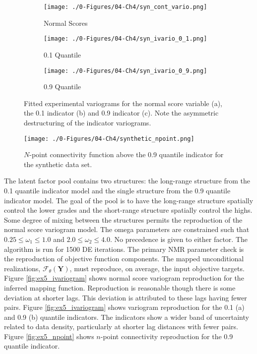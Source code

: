 \begin{figure}
    \begin{subfigure}{1.0\textwidth}
        \centering
        \texttt{[image: ./0-Figures/04-Ch4/syn\_cont\_vario.png]}
        \caption{Normal Scores}
    \end{subfigure}
    \begin{subfigure}{1.0\textwidth}
        \centering
        \texttt{[image: ./0-Figures/04-Ch4/syn\_ivario\_0\_1.png]}
        \caption{0.1 Quantile}
    \end{subfigure}
    \begin{subfigure}{1.0\textwidth}
        \centering
        \texttt{[image: ./0-Figures/04-Ch4/syn\_ivario\_0\_9.png]}
        \caption{0.9 Quantile}
    \end{subfigure}
    \caption{Fitted experimental variograms for the normal score variable (a), the 0.1 indicator (b) and 0.9 indicator (c). Note the asymmetric destructuring of the indicator variograms. }
    \label{fig:synthetic_varios}
\end{figure}

\begin{figure}[htb!]
    \centering
    \texttt{[image: ./0-Figures/04-Ch4/synthetic\_npoint.png]}
    \caption{$N$-point connectivity function above the 0.9 quantile indicator for the synthetic data set.}
    \label{fig:synthetic_npoint}
\end{figure}

The latent factor pool contains two structures: the long-range structure from the 0.1 quantile indicator model and the single structure from the 0.9 quantile indicator model. The goal of the pool is to have the long-range structure spatially control the lower grades and the short-range structure spatially control the highs. Some degree of mixing between the structures permits the reproduction of the normal score variogram model. The omega parameters are constrained such that $0.25 \leq \omega_{1} \leq 1.0$ and $2.0 \leq \omega_{2} \leq 4.0$. No precedence is given to either factor. The algorithm is run for 1500 \gls{DE} iterations. The primary \gls{NMR} parameter check is the reproduction of objective function components. The mapped unconditional realizations, $\mathcal{F}_{\theta}\left(\mathbf{Y}\right)$, must reproduce, on average, the input objective targets. Figure \ref{fig:ex5_ivariogram} shows normal score variogram reproduction for the inferred mapping function. Reproduction is reasonable though there is some deviation at shorter lags. This deviation is attributed to these lags having fewer pairs. Figure \ref{fig:ex5_ivariogram} shows variogram reproduction for the 0.1 (a) and 0.9 (b) quantile indicators. The indicators show a wider band of uncertainty related to data density, particularly at shorter lag distances with fewer pairs. Figure \ref{fig:ex5_npoint} shows $n$-point connectivity reproduction for the 0.9 quantile indicator.

